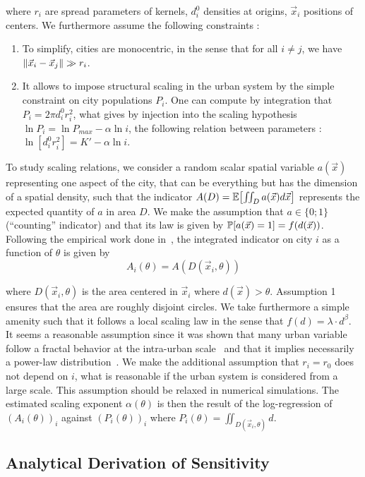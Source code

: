 where $r_i$ are spread parameters of kernels, $d_i^0$ densities at origins, $\vec{x}_i$ positions of centers. We furthermore assume the following constraints :

\begin{enumerate}
\item To simplify, cities are monocentric, in the sense that for all $i\neq j$, we have $\| \vec{x}_i - \vec{x}_j \|\gg r_i$.
\item It allows to impose structural scaling in the urban system by the simple constraint on city populations $P_i$. One can compute by integration that $P_i=2\pi d_i^0 r_i^2$, what gives by injection into the scaling hypothesis $\ln{P_i}=\ln{P_{max}}-\alpha \ln{i}$, the following relation between parameters : $\ln{\left[d_i^0 r_i^2\right]}=K' - \alpha \ln{i}$.
\end{enumerate}

To study scaling relations, we consider a random scalar spatial variable $a(\vec{x})$ representing one aspect of the city, that can be everything but has the dimension of a spatial density, such that the indicator $A(D)=\operatorname{\mathbb{E}}\!\left[\iint_D{a(\vec{x})d\vec{x}}\right]$ represents the expected quantity of $a$ in area $D$. We make the assumption that $a\in \{0;1\}$ (``counting'' indicator) and that its law is given by $\operatorname{\mathbb{P}}\!\left[a(\vec{x})=1\right]=f(d(\vec{x}))$. Following the empirical work done in~\cite{cottineau2015scaling}, the integrated indicator on city $i$ as a function of $\theta$ is given by
\[
A_i(\theta) = A(D(\vec{x}_i, \theta))
\]

where $D(\vec{x}_i, \theta)$ is the area centered in $\vec{x}_i$ where $d(\vec{x})>\theta$. Assumption 1 ensures that the area are roughly disjoint circles. We take furthermore a simple amenity such that it follows a local scaling law in the sense that $f(d)=\lambda\cdot d^\beta$. It seems a reasonable assumption since it was shown that many urban variable follow a fractal behavior at the intra-urban scale~\cite{keersmaecker2003using} and that it implies necessarily a power-law distribution~\cite{chen2010characterizing}. We make the additional assumption that $r_i=r_0$ does not depend on $i$, what is reasonable if the urban system is considered from a large scale. This assumption should be relaxed in numerical simulations. The estimated scaling exponent $\alpha(\theta)$ is then the result of the log-regression of $(A_i(\theta))_i$ against $(P_i(\theta))_i$ where $P_i(\theta)=\iint_{D(\vec{x}_i,\theta)}{d}$.


\subsection{Analytical Derivation of Sensitivity}

